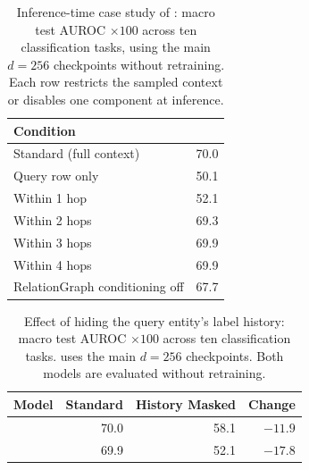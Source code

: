 \begin{table}[t]
\centering
\caption{Inference-time case study of \model{}: macro test AUROC
$\times100$ across ten classification tasks, using the main $d=256$
checkpoints without retraining. Each row restricts the sampled context or
disables one component at inference.}
\label{tab:case_study}
\small
\setlength{\tabcolsep}{12pt}
\begin{tabular}{lr}
\toprule
Condition & \model{} \\
\midrule
Standard (full context) & 70.0 \\
\midrule
Query row only & 50.1 \\
Within 1 hop & 52.1 \\
Within 2 hops & 69.3 \\
Within 3 hops & 69.9 \\
Within 4 hops & 69.9 \\
\midrule
RelationGraph conditioning off & 67.7 \\
\bottomrule
\end{tabular}
\end{table}

\begin{table}[t]
\centering
\caption{Effect of hiding the query entity's label history: macro test
AUROC $\times100$ across ten classification tasks. \model{} uses the main
$d=256$ checkpoints. Both models are evaluated without retraining.}
\label{tab:history_masked}
\small
\setlength{\tabcolsep}{8pt}
\begin{tabular}{lrrr}
\toprule
Model & Standard & History Masked & Change \\
\midrule
\model{} & 70.0 & 58.1 & $-11.9$ \\
\RT{} & 69.9 & 52.1 & $-17.8$ \\
\bottomrule
\end{tabular}
\end{table}
